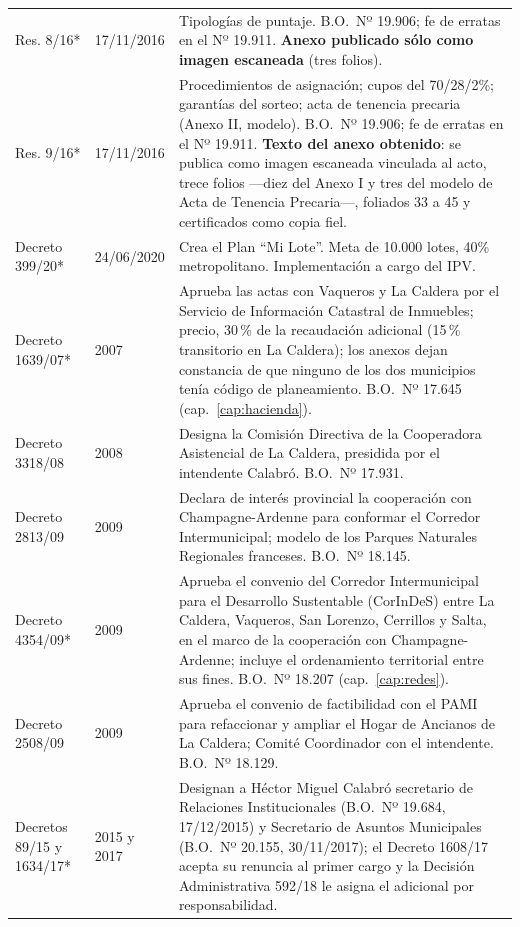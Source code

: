 \begin{longtable}{@{}p{3.2cm}p{1.9cm}p{7.9cm}@{}}
Res. 8/16* & 17/11/2016 & Tipologías de puntaje. B.O.\ Nº 19.906; fe de erratas en el Nº 19.911. \textbf{Anexo publicado sólo como imagen escaneada} (tres folios). \\
Res. 9/16* & 17/11/2016 & Procedimientos de asignación; cupos del 70/28/2\%; garantías del sorteo; acta de tenencia precaria (Anexo II, modelo). B.O.\ Nº 19.906; fe de erratas en el Nº 19.911. \textbf{Texto del anexo obtenido}: se publica como imagen escaneada vinculada al acto, trece folios ---diez del Anexo I y tres del modelo de Acta de Tenencia Precaria---, foliados 33 a 45 y certificados como copia fiel. \\
Decreto 399/20* & 24/06/2020 & Crea el Plan ``Mi Lote''. Meta de 10.000 lotes, 40\% metropolitano. Implementación a cargo del IPV. \\
Decreto 1639/07* & 2007 & Aprueba las actas con Vaqueros y La Caldera por el Servicio de Información Catastral de Inmuebles; precio, 30\,\% de la recaudación adicional (15\,\% transitorio en La Caldera); los anexos dejan constancia de que ninguno de los dos municipios tenía código de planeamiento. B.O.\ Nº 17.645 (cap.\ \ref{cap:hacienda}). \\
Decreto 3318/08 & 2008 & Designa la Comisión Directiva de la Cooperadora Asistencial de La Caldera, presidida por el intendente Calabró. B.O.\ Nº 17.931. \\
Decreto 2813/09 & 2009 & Declara de interés provincial la cooperación con Champagne-Ardenne para conformar el Corredor Intermunicipal; modelo de los Parques Naturales Regionales franceses. B.O.\ Nº 18.145. \\
Decreto 4354/09* & 2009 & Aprueba el convenio del Corredor Intermunicipal para el Desarrollo Sustentable (CorInDeS) entre La Caldera, Vaqueros, San Lorenzo, Cerrillos y Salta, en el marco de la cooperación con Champagne-Ardenne; incluye el ordenamiento territorial entre sus fines. B.O.\ Nº 18.207 (cap.\ \ref{cap:redes}). \\
Decreto 2508/09 & 2009 & Aprueba el convenio de factibilidad con el PAMI para refaccionar y ampliar el Hogar de Ancianos de La Caldera; Comité Coordinador con el intendente. B.O.\ Nº 18.129. \\
Decretos 89/15 y 1634/17* & 2015 y 2017 & Designan a Héctor Miguel Calabró secretario de Relaciones Institucionales (B.O.\ Nº 19.684, 17/12/2015) y Secretario de Asuntos Municipales (B.O.\ Nº 20.155, 30/11/2017); el Decreto 1608/17 acepta su renuncia al primer cargo y la Decisión Administrativa 592/18 le asigna el adicional por responsabilidad. \\

\end{longtable}
